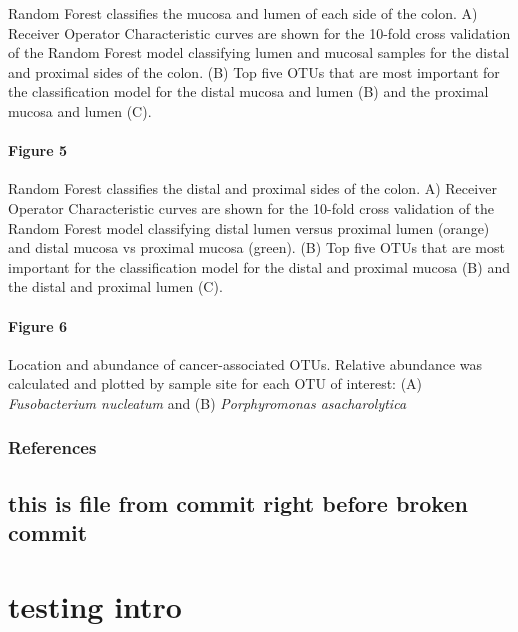 \documentclass[11pt,]{article}
\let\oldparagraph\paragraph
\renewcommand{\paragraph}[1]{\oldparagraph{#1}\mbox{}}
\begin{document}
Random Forest classifies the mucosa and lumen of each side of the colon.
A) Receiver Operator Characteristic curves are shown for the 10-fold
cross validation of the Random Forest model classifying lumen and
mucosal samples for the distal and proximal sides of the colon. (B) Top
five OTUs that are most important for the classification model for the
distal mucosa and lumen (B) and the proximal mucosa and lumen (C).

\newpage

\paragraph{Figure 5}\label{figure-5}

Random Forest classifies the distal and proximal sides of the colon. A)
Receiver Operator Characteristic curves are shown for the 10-fold cross
validation of the Random Forest model classifying distal lumen versus
proximal lumen (orange) and distal mucosa vs proximal mucosa (green).
(B) Top five OTUs that are most important for the classification model
for the distal and proximal mucosa (B) and the distal and proximal lumen
(C).

\newpage

\paragraph{Figure 6}\label{figure-6}

Location and abundance of cancer-associated OTUs. Relative abundance was
calculated and plotted by sample site for each OTU of interest: (A)
\emph{Fusobacterium nucleatum} and (B) \emph{Porphyromonas
asacharolytica}

\subsubsection{References}\label{references}

\subsection{this is file from commit right before broken
commit}\label{this-is-file-from-commit-right-before-broken-commit}

\section*{testing intro}\label{testing-intro}
\end{document}
